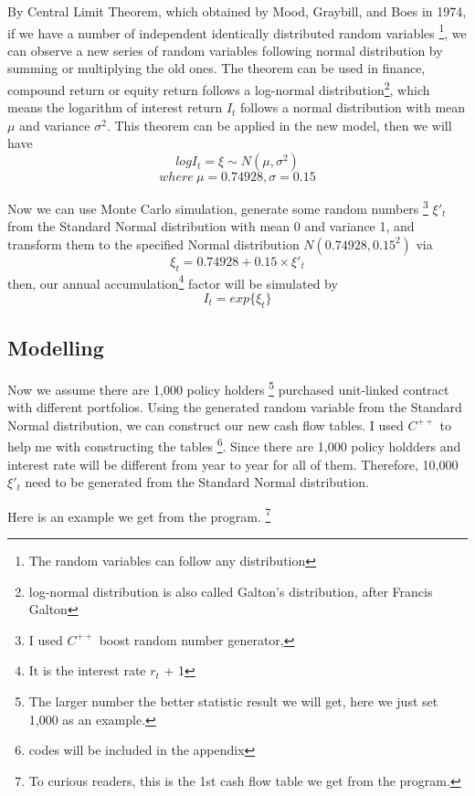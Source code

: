 \documentclass{report}
\begin{document}
By \cite{bib:CLT}Central Limit Theorem, which obtained by Mood, Graybill, and Boes in 1974, if we have a number of independent identically distributed random variables \footnote{The random variables can follow any distribution}, we can observe a new series of random variables following normal distribution by summing or multiplying the old ones. The theorem can be used in finance, compound return or equity return follows a log-normal distribution\footnote{log-normal distribution is also called Galton's distribution, after Francis Galton}, which means the logarithm of interest return $I_t$ follows a normal distribution with mean $\mu$ and variance $\sigma^2$. This theorem can be applied in the new model, then we will have
\[
logI_t = \xi \sim N(\mu,\sigma^2)
\]
\[
where\   \mu= 0.74928, \sigma= 0.15 
\]

Now we can use Monte Carlo simulation\cite{bib:MCS}, generate some random numbers \footnote{I used $C^{++}$ boost random number generator, } $\xi'_t$ from the Standard Normal distribution with mean 0 and variance 1, and transform them to the specified Normal distribution $N(0.74928,0.15^2)$ via   
\[
\xi_t = 0.74928 + 0.15\times \xi'_t
\]
then, our annual accumulation\footnote{It is the interest rate $r_t$ + 1} factor will be simulated by 
\[
I_t=exp\{\xi_t\} 
\]



\subsection{Modelling}

Now we assume there are 1,000 policy holders \footnote{The larger number the better statistic result we will get, here we just set 1,000 as an example.} purchased unit-linked contract with different portfolios. Using the generated random variable from the Standard Normal distribution, we can construct our new cash flow tables. I used $C^{++}$ to help me with constructing the tables \footnote{codes will be included in the appendix}. Since there are 1,000 policy holdders and interest rate will be different from year to year for all of them. Therefore, 10,000  $\xi'_t$ need to be generated from the Standard Normal distribution.


Here is an example we get from the program. \footnote{To curious readers, this is the 1st cash flow table we get from the program.}
\end{document}

